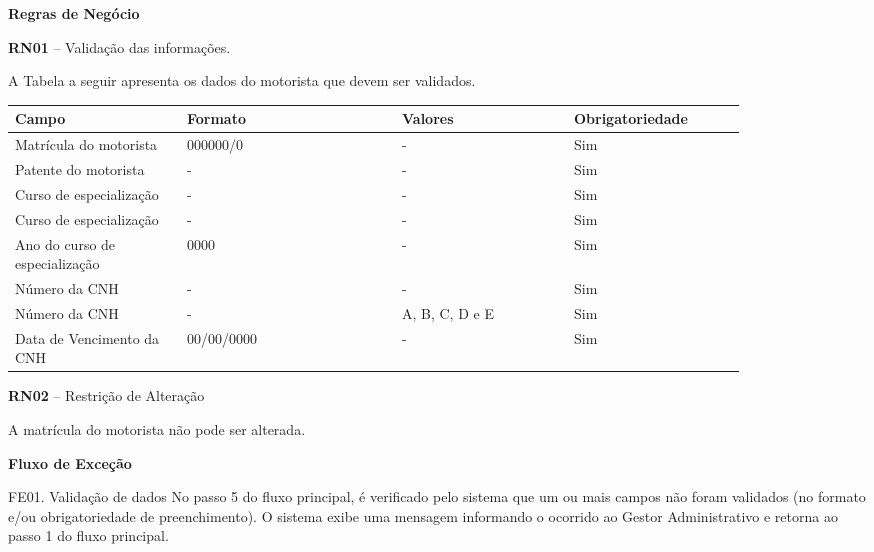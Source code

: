   
   {\raggedright
      \textbf{Regras de Negócio}
   }
   
   \textbf{RN01} – Validação das informações.
   
   A Tabela a seguir apresenta os dados do motorista que devem ser validados.
   
   \begin{table*}[!h]
    \centering
      \begin{tabular}{|p{0.20\linewidth}|p{0.25\linewidth}|p{0.20\linewidth}|p{0.20\linewidth}|}
      \hline
      Campo  & Formato & Valores & Obrigatoriedade\\
      \hline

      Matrícula do motorista & 000000/0 & - & Sim\\ \hline

      Patente do motorista & - & - & Sim\\\hline
      
      Curso de especialização & - & - & Sim\\\hline
      
      Curso de especialização & - & - & Sim\\\hline
      
      Ano do curso de especialização & 0000 & - & Sim\\\hline
      
      Número da CNH & - & - & Sim\\\hline
      
      Número da CNH & - & A, B, C, D e E & Sim\\\hline
      
      Data de Vencimento da CNH & 00/00/0000 & - & Sim\\\hline
      
      \hline
      \end{tabular}
    \end{table*}

    \pagebreak
    
    \textbf{RN02} – Restrição de Alteração
    
      A matrícula do motorista não pode ser alterada.
    
   {\raggedright
      \textbf{Fluxo de Exceção}
   }
   
   FE01. Validação de dados
	No passo 5 do fluxo principal, é verificado pelo sistema que um ou mais campos não foram validados
	(no formato e/ou obrigatoriedade de preenchimento). O sistema exibe uma mensagem informando o ocorrido ao Gestor
	Administrativo e retorna ao passo 1 do fluxo principal.
	

